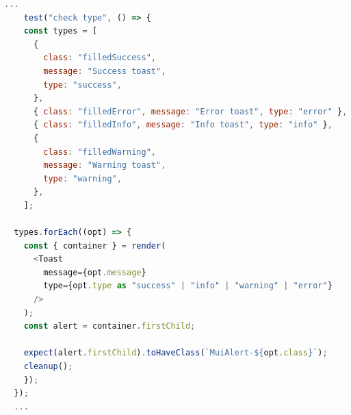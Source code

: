 \begin{lstlisting}[language=Javascript, caption=Өгсөн type-н дагуу зурагдаж байгаа эсэхийг шалгах, frame=single]
	...  
	test("check type", () => {
    const types = [
      {
        class: "filledSuccess",
        message: "Success toast",
        type: "success",
      },
      { class: "filledError", message: "Error toast", type: "error" },
      { class: "filledInfo", message: "Info toast", type: "info" },
      {
        class: "filledWarning",
        message: "Warning toast",
        type: "warning",
      },
    ];

  types.forEach((opt) => {
    const { container } = render(
      <Toast
        message={opt.message}
        type={opt.type as "success" | "info" | "warning" | "error"}
      />
    );
    const alert = container.firstChild;

    expect(alert.firstChild).toHaveClass(`MuiAlert-${opt.class}`);
    cleanup();
    });
  });
  ...
\end{lstlisting}



